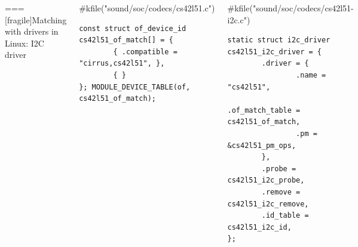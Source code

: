 \begin{columns}[t]
\begin{columns}[t]
\begin{columns}[t]
\begin{columns}[t]
=== [fragile]{Matching with drivers in Linux: I2C driver}
  \begin{block}{#kfile("sound/soc/codecs/cs42l51.c")}
    {\tiny
\begin{verbatim}
const struct of_device_id cs42l51_of_match[] = {
        { .compatible = "cirrus,cs42l51", },
        { }
}; MODULE_DEVICE_TABLE(of, cs42l51_of_match);
\end{verbatim}
    }
  \end{block}
  \begin{block}{#kfile("sound/soc/codecs/cs42l51-i2c.c")}
    {\tiny
\begin{verbatim}
static struct i2c_driver cs42l51_i2c_driver = {
        .driver = {
                .name = "cs42l51",
                .of_match_table = cs42l51_of_match,
                .pm = &cs42l51_pm_ops,
        },
        .probe = cs42l51_i2c_probe,
        .remove = cs42l51_i2c_remove,
        .id_table = cs42l51_i2c_id,
};
\end{verbatim}
    }
  \end{block}



\end{columns}
\end{columns}
\end{columns}
\end{columns}
